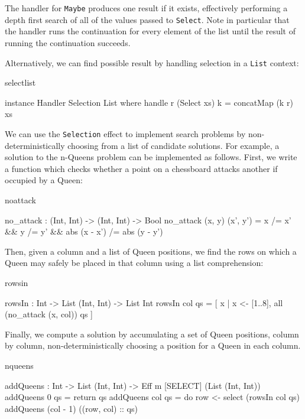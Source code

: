 \noindent
The handler for \texttt{Maybe} produces one result if it exists, effectively
performing a depth first search of all of the values passed to \texttt{Select}.
Note in particular that the handler runs the continuation for every element
of the list until the result of running the continuation succeeds.

Alternatively, we can find  possible result by handling selection
in a \texttt{List} context:

\begin{SaveVerbatim}{selectlist}

instance Handler Selection List where
     handle r (Select xs) k = concatMap (k r) xs

\end{SaveVerbatim}

\noindent
We can use the \texttt{Selection} effect to implement search problems by
non-deterministically choosing from a list of candidate solutions. For example,
a solution to the n-Queens problem can be implemented as follows.
First, we write a function which checks whether a point on a chessboard
attacks another if occupied by a Queen:

\begin{SaveVerbatim}{noattack}

no_attack : (Int, Int) -> (Int, Int) -> Bool
no_attack (x, y) (x', y')
  = x /= x' && y /= y' && abs (x - x') /= abs (y - y')

\end{SaveVerbatim}

\noindent
Then, given a column and a list of Queen positions, we find the rows on which
a Queen may safely be placed in that column using a list comprehension:

\begin{SaveVerbatim}{rowsin}

rowsIn : Int -> List (Int, Int) -> List Int
rowsIn col qs 
   = [ x | x <- [1..8], all (no_attack (x, col)) qs ]

\end{SaveVerbatim}

\noindent
Finally, we compute a solution by accumulating a set of Queen positions,
column by column, non-deterministically choosing a position for a Queen in
each column.

\begin{SaveVerbatim}{nqueens}

addQueens : Int -> List (Int, Int) -> 
            Eff m [SELECT] (List (Int, Int))
addQueens 0   qs = return qs
addQueens col qs 
   = do row <- select (rowsIn col qs)
        addQueens (col - 1) ((row, col) :: qs)

\end{SaveVerbatim}

